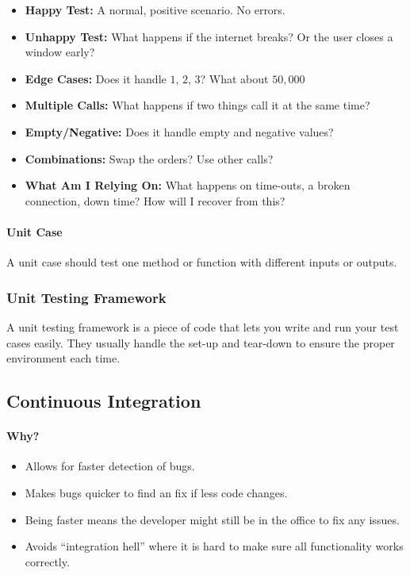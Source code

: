 \begin{itemize}
    \item \textbf{Happy Test:} A normal, positive scenario. No errors.
    \item \textbf{Unhappy Test:} What happens if the internet breaks? Or the user closes a window early?
    \item \textbf{Edge Cases:} Does it handle \(1\), \(2\), \(3\)? What about \(50,000\)
    \item \textbf{Multiple Calls:} What happens if two things call it at the same time?
    \item \textbf{Empty/Negative:} Does it handle empty and negative values?
    \item \textbf{Combinations:} Swap the orders? Use other calls?
    \item \textbf{What Am I Relying On:} What happens on time-outs, a broken connection, down time? How will I recover from this?
\end{itemize}

\paragraph{Unit Case}\label{par:unit_case}

A unit case should test one method or function with different inputs or outputs.

\subsubsection{Unit Testing Framework}\label{ssub:unit_testing_framework}

A unit testing framework is a piece of code that lets you write and run your test cases easily.
They usually handle the set-up and tear-down to ensure the proper environment each time.

\subsection{Continuous Integration}\label{sub:continuous_integration}

\paragraph{Why?}\label{par:why_}

\begin{itemize}
    \item Allows for faster detection of bugs.
    \item Makes bugs quicker to find an fix if less code changes.
    \item Being faster means the developer might still be in the office to fix any issues.
    \item Avoids ``integration hell'' where it is hard to make sure all functionality works correctly.
\end{itemize}

